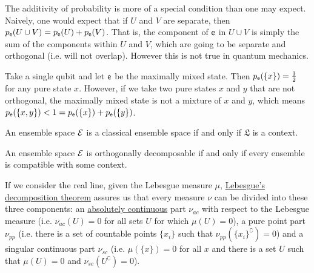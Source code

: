 \begin{remark}
	The additivity of probability is more of a special condition than one may expect. Naively, one would expect that if $U$ and $V$ are separate, then $p_{\mathsf{e}}(U \cup V) = p_{\mathsf{e}}(U) + p_{\mathsf{e}}(V)$. That is, the component of $\mathsf{e}$ in $U \cup V$ is simply the sum of the components within $U$ and $V$, which are going to be separate and orthogonal (i.e. will not overlap). However this is not true in quantum mechanics.
	
	Take a single qubit and let $\mathsf{e}$ be the maximally mixed state. Then $p_{\mathsf{e}}(\{x\}) = \frac{1}{2}$ for any pure state $x$. However, if we take two pure states $x$ and $y$ that are not orthogonal, the maximally mixed state is not a mixture of $x$ and $y$, which means $p_{\mathsf{e}}(\{x, y\}) < 1 = p_{\mathsf{e}}(\{x\}) + p_{\mathsf{e}}(\{y\})$.
\end{remark}

\begin{conj}
	An ensemble space $\mathcal{E}$ is a classical ensemble space if and only if $\mathfrak{L}$ is a context.
\end{conj}

\begin{conj}
	An ensemble space $\mathcal{E}$ is orthogonally decomposable if and only if every ensemble is compatible with some context.
\end{conj}


If we consider the real line, given the Lebesgue measure $\mu$, \href{https://en.wikipedia.org/wiki/Lebesgue%27s_decomposition_theorem}{Lebesgue's decomposition theorem} assures us that every measure $\nu$ can be divided into these three components: an \href{https://en.wikipedia.org/wiki/Absolute_continuity#Absolute_continuity_of_measures}{absolutely continuous} part $\nu_{ac}$ with respect to the Lebesgue measure (i.e. $\nu_{ac}(U)=0$ for all sets $U$ for which $\mu(U)=0$), a pure point part $\nu_{pp}$ (i.e. there is a set of countable points $\{x_i\}$ such that $\nu_{pp}(\{x_i\}^{\complement})=0$) and a singular continuous part $\nu_{sc}$ (i.e. $\mu(\{x\})=0$ for all $x$ and there is a set $U$ such that $\mu(U)=0$ and $\nu_{sc}(U^{\complement})=0$).

